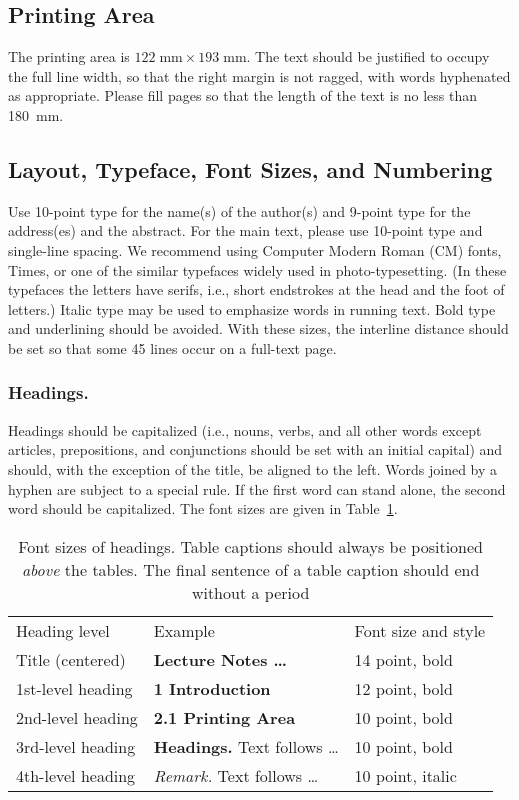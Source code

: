 \documentclass[runningheads]{llncs}
\begin{document}
\subsection{Printing Area}
The printing area is $122  \; \mbox{mm} \times 193 \;
\mbox{mm}$.
The text should be justified to occupy the full line width,
so that the right margin is not ragged, with words hyphenated as
appropriate. Please fill pages so that the length of the text
is no less than 180~mm.

\subsection{Layout, Typeface, Font Sizes, and Numbering}
Use 10-point type for the name(s) of the author(s) and 9-point type for
the address(es) and the abstract. For the main text, please use 10-point
type and single-line spacing.
We recommend using Computer Modern Roman (CM) fonts, Times, or one
of the similar typefaces widely used in photo-typesetting.
(In these typefaces the letters have serifs, i.e., short endstrokes at
the head and the foot of letters.)
Italic type may be used to emphasize words in running text. Bold
type and underlining should be avoided.
With these sizes, the interline distance should be set so that some 45
lines occur on a full-text page.

\subsubsection{Headings.}

Headings should be capitalized
(i.e., nouns, verbs, and all other words
except articles, prepositions, and conjunctions should be set with an
initial capital) and should,
with the exception of the title, be aligned to the left.
Words joined by a hyphen are subject to a special rule. If the first
word can stand alone, the second word should be capitalized.
The font sizes
are given in Table~\ref{table:headings}.
\setlength{\tabcolsep}{4pt}
\begin{table}
\begin{center}
\caption{Font sizes of headings. Table captions should always be
positioned {\it above} the tables. The final sentence of a table
caption should end without a period}
\label{table:headings}
\begin{tabular}{lll}
\hline\noalign{\smallskip}
Heading level & Example & Font size and style\\
\noalign{\smallskip}
\hline
\noalign{\smallskip}
Title (centered)  & {\Large \bf Lecture Notes \dots} & 14 point, bold\\
1st-level heading & {\large \bf 1 Introduction} & 12 point, bold\\
2nd-level heading & {\bf 2.1 Printing Area} & 10 point, bold\\
3rd-level heading & {\bf Headings.} Text follows \dots & 10 point, bold
\\
4th-level heading & {\it Remark.} Text follows \dots & 10 point,
italic\\
\hline
\end{tabular}
\end{center}
\end{table}
\setlength{\tabcolsep}{1.4pt}
\end{document}
